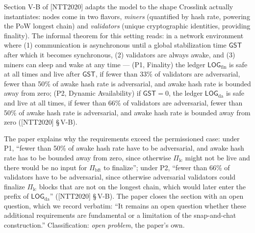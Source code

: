 \documentclass[11pt,a4paper]{article}
\theoremstyle{definition}
\begin{document}
Section V-B of [NTT2020] adapts the model to the shape Crosslink actually
instantiates: nodes come in two flavors, \emph{miners} (quantified by hash
rate, powering the PoW longest chain) and \emph{validators} (unique
cryptographic identities, providing finality). The informal theorem for
this setting reads: in a network environment where (1) communication is
asynchronous until a global stabilization time $\mathsf{GST}$ after which
it becomes synchronous, (2) validators are always awake, and (3) miners
can sleep and wake at any time --- (P1, Finality) the ledger
$\mathsf{LOG}_{\mathrm{fin}}$ is safe at all times and live after
$\mathsf{GST}$, if fewer than 33\% of validators are adversarial, fewer
than 50\% of awake hash rate is adversarial, and awake hash rate is
bounded away from zero; (P2, Dynamic Availability) if $\mathsf{GST} = 0$,
the ledger $\mathsf{LOG}_{\mathrm{da}}$ is safe and live at all times, if
fewer than 66\% of validators are adversarial, fewer than 50\% of awake
hash rate is adversarial, and awake hash rate is bounded away from zero
([NTT2020] \S\,V-B).

The paper explains why the requirements exceed the permissioned case:
under P1, ``fewer than 50\% of awake hash rate have to be adversarial, and
awake hash rate has to be bounded away from zero, since otherwise
$\Pi_{\mathrm{lc}}$ might not be live and there would be no input for
$\Pi_{\mathrm{bft}}$ to finalize''; under P2, ``fewer than 66\% of
validators have to be adversarial, since otherwise adversarial validators
could finalize $\Pi_{\mathrm{lc}}$ blocks that are not on the longest
chain, which would later enter the prefix of
$\mathsf{LOG}_{\mathrm{da}}$'' ([NTT2020] \S\,V-B). The paper closes the
section with an open question, which we record verbatim: ``It remains an
open question whether these additional requirements are fundamental or a
limitation of the snap-and-chat construction.'' Classification: \emph{open
problem}, the paper's own.
\end{document}
